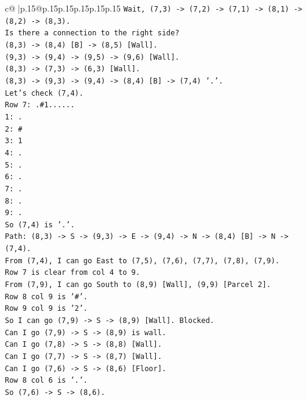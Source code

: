 \documentclass{article}
\begin{document}
{\begin{supertabular}{c@{$\;$}|p{.15\linewidth}@{}p{.15\linewidth}p{.15\linewidth}p{.15\linewidth}p{.15\linewidth}p{.15\linewidth}}
{{{\texttt{Wait, (7,3) {-}> (7,2) {-}> (7,1) {-}> (8,1) {-}> (8,2) {-}> (8,3).} \\
\texttt{Is there a connection to the right side?} \\
\texttt{(8,3) {-}> (8,4) {[}B{]} {-}> (8,5) {[}Wall{]}.} \\
\texttt{(9,3) {-}> (9,4) {-}> (9,5) {-}> (9,6) {[}Wall{]}.} \\
\texttt{(8,3) {-}> (7,3) {-}> (6,3) {[}Wall{]}.} \\
\texttt{(8,3) {-}> (9,3) {-}> (9,4) {-}> (8,4) {[}B{]} {-}> (7,4) '.'.} \\
\texttt{Let's check (7,4).} \\
\texttt{Row 7: .\#1......} \\
\texttt{1: .} \\
\texttt{2: \#} \\
\texttt{3: 1} \\
\texttt{4: .} \\
\texttt{5: .} \\
\texttt{6: .} \\
\texttt{7: .} \\
\texttt{8: .} \\
\texttt{9: .} \\
\texttt{So (7,4) is '.'.} \\
\texttt{Path: (8,3) {-}> S {-}> (9,3) {-}> E {-}> (9,4) {-}> N {-}> (8,4) {[}B{]} {-}> N {-}> (7,4).} \\
\texttt{From (7,4), I can go East to (7,5), (7,6), (7,7), (7,8), (7,9).} \\
\texttt{Row 7 is clear from col 4 to 9.} \\
\texttt{From (7,9), I can go South to (8,9) {[}Wall{]}, (9,9) {[}Parcel 2{]}.} \\
\texttt{Row 8 col 9 is '\#'.} \\
\texttt{Row 9 col 9 is '2'.} \\
\texttt{So I can go (7,9) {-}> S {-}> (8,9) {[}Wall{]}. Blocked.} \\
\texttt{Can I go (7,9) {-}> S {-}> (8,9) is wall.} \\
\texttt{Can I go (7,8) {-}> S {-}> (8,8) {[}Wall{]}.} \\
\texttt{Can I go (7,7) {-}> S {-}> (8,7) {[}Wall{]}.} \\
\texttt{Can I go (7,6) {-}> S {-}> (8,6) {[}Floor{]}.} \\
\texttt{Row 8 col 6 is '.'.} \\
\texttt{So (7,6) {-}> S {-}> (8,6).} \\
}}}
\end{supertabular}}
\end{document}
